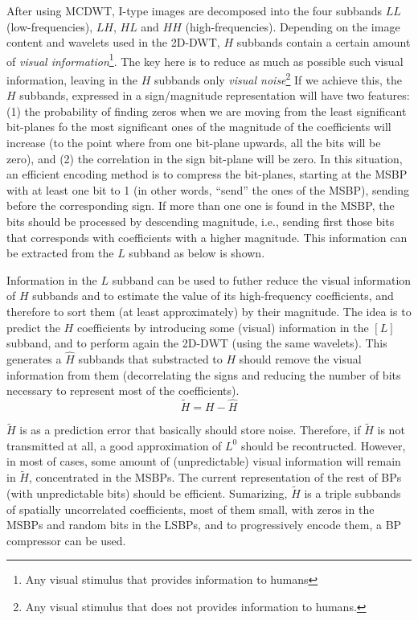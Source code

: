 After using MCDWT, I-type images are decomposed into
the four subbands $LL$ (low-frequencies), $LH$, $HL$ and $HH$
(high-frequencies). Depending on the image content and wavelets used
in the 2D-DWT, $H$ subbands contain a certain amount of \emph{visual
  information}\footnote{Any visual stimulus that provides information
  to humans}. The key here is to reduce as much as possible such
visual information, leaving in the $H$ subbands only \emph{visual
  noise}\footnote{Any visual stimulus that does not provides
  information to humans.} If we achieve this, the $H$ subbands,
expressed in a sign/magnitude representation will have two features:
(1) the probability of finding zeros when we are moving from the least
significant bit-planes fo the most significant ones of the magnitude
of the coefficients will increase (to the point where from one
bit-plane upwards, all the bits will be zero), and (2) the correlation
in the sign bit-plane will be zero. In this situation, an efficient
encoding method is to compress the bit-planes, starting at the MSBP
with at least one bit to 1 (in other words, ``send'' the ones of the
MSBP), sending before the corresponding sign. If more than one one is
found in the MSBP, the bits should be processed by descending
magnitude, i.e., sending first those bits that corresponds with
coefficients with a higher magnitude. This information can be
extracted from the $L$ subband as below is shown.

Information in the $L$ subband can be used to futher reduce the visual
information of $H$ subbands and to estimate the value of its
high-frequency coefficients, and therefore to sort them (at least
approximately) by their magnitude. The idea is to predict the $H$
coefficients by introducing some (visual) information in the $[L]$
subband, and to perform again the 2D-DWT (using the same
wavelets). This generates a $\hat{H}$ subbands that substracted to $H$
should remove the visual information from them (decorrelating the
signs and reducing the number of bits necessary to represent most of
the coefficients).
\begin{equation}
  \tilde{H} = H - \hat{H}
\end{equation}

$\tilde{H}$ is as a prediction error that basically should store
noise. Therefore, if $\tilde{H}$ is not transmitted at all, a good
approximation of $L^0$ should be recontructed. However, in most of
cases, some amount of (unpredictable) visual information will remain
in $\tilde{H}$, concentrated in the MSBPs. The current representation
of the rest of BPs (with unpredictable bits) should be
efficient. Sumarizing, $\tilde{H}$ is a triple subbands of spatially
uncorrelated coefficients, most of them small, with zeros in the MSBPs
and random bits in the LSBPs, and to progressively encode them, a BP
compressor can be used.

